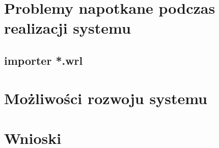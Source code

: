 \documentclass[brudnopis]{xmgr}
\begin{document}
\section {Problemy napotkane podczas realizacji systemu}
\subsection {importer *.wrl}
\section{Możliwości rozwoju systemu}
\section{Wnioski}



\summary






\listoftables

\listoffigures

\oswiadczenie
\end{document}
